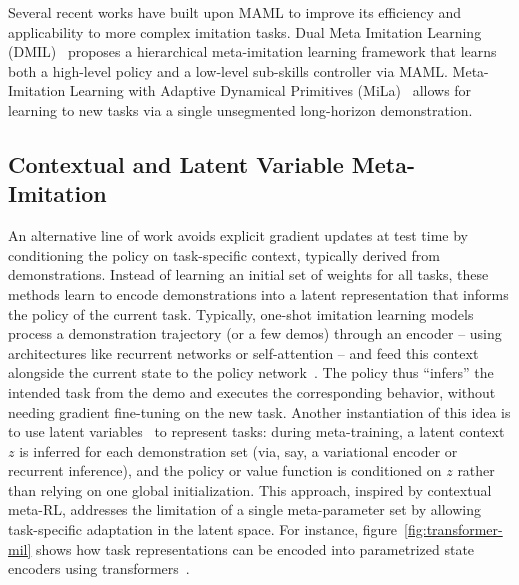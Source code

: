 Several recent works have built upon MAML to improve its efficiency and applicability to more complex imitation tasks.
Dual Meta Imitation Learning (DMIL)~\cite{gao2022transferring} proposes a hierarchical meta-imitation learning framework that learns both a high-level policy and a low-level sub-skills controller via MAML.
Meta-Imitation Learning with Adaptive Dynamical Primitives (MiLa)~\cite{Wu2024OneShotRI} allows for learning to new tasks via a single unsegmented long-horizon demonstration.

\subsection{Contextual and Latent Variable Meta-Imitation}\label{subsec:contextual-and-latent-variable-meta-imitation}

An alternative line of work avoids explicit gradient updates at test time by conditioning the policy on task-specific context, typically derived from demonstrations.
Instead of learning an initial set of weights for all tasks, these methods learn to encode demonstrations into a latent representation that informs the policy of the current task.
Typically, one-shot imitation learning models process a demonstration trajectory (or a few demos) through an encoder – using architectures like recurrent networks or self-attention – and feed this context alongside the current state to the policy network~\cite{Duan2017OneShotIL}.
The policy thus “infers” the intended task from the demo and executes the corresponding behavior, without needing gradient fine-tuning on the new task.
Another instantiation of this idea is to use latent variables~\cite{sontakke2023roboclip, NEURIPS2019_2b8f621e, NEURIPS2019_30de2428, 10.3389/frobt.2020.606361, Bhoopchand2023LearningFI} to represent tasks: during meta-training, a latent context $z$ is inferred for each demonstration set (via, say, a variational encoder or recurrent inference), and the policy or value function is conditioned on $z$ rather than relying on one global initialization.
This approach, inspired by contextual meta-RL, addresses the limitation of a single meta-parameter set by allowing task-specific adaptation in the latent space.
For instance, figure~\ref{fig:transformer-mil} shows how task representations can be encoded into parametrized state encoders using transformers~\cite{cho2024metacontroller}.

